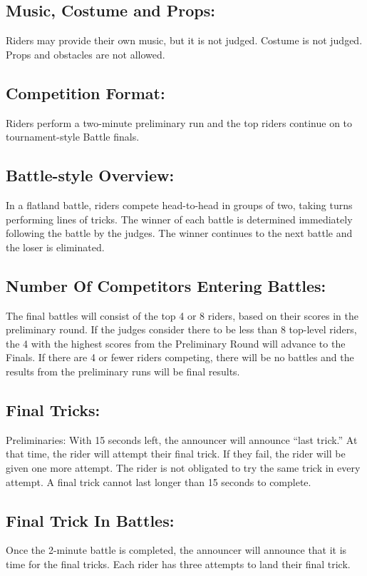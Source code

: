 \subsection{Music, Costume and Props:}
Riders may provide their own music, but it is not judged.
Costume is not judged.
Props and obstacles are not allowed.

\subsection{Competition Format:}
Riders perform a two-minute preliminary run and the top riders continue on to tournament-style Battle finals.

\subsection{Battle-style Overview:}
In a flatland battle, riders compete head-to-head in groups of two, taking turns performing lines of tricks.
The winner of each battle is determined immediately following the battle by the judges.
The winner continues to the next battle and the loser is eliminated.

\subsection{Number Of Competitors Entering Battles:}
The final battles will consist of the top 4 or 8 riders, based on their scores in the preliminary round.
If the judges consider there to be less than 8 top-level riders, the 4 with the highest scores from the Preliminary Round will advance to the Finals.
If there are 4 or fewer riders competing, there will be no battles and the results from the preliminary runs will be final results.

\subsection{Final Tricks:}
Preliminaries: With 15 seconds left, the announcer will announce ``last trick.''
At that time, the rider will attempt their final trick.
If they fail, the rider will be given one more attempt.
The rider is not obligated to try the same trick in every attempt.
A final trick cannot last longer than 15 seconds to complete.

\subsection{Final Trick In Battles:}
Once the 2-minute battle is completed, the announcer will announce that it is time for the final tricks.
Each rider has three attempts to land their final trick.

